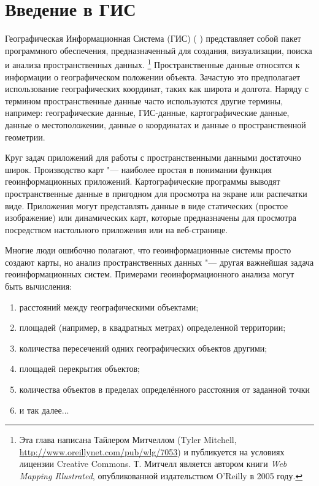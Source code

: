 \pagestyle{scrheadings}
\chapter{Введение в ГИС}\label{label_intro}


Географическая Информационная Система (ГИС) (\cite{mitchel05}
) представляет собой пакет программного обеспечения, предназначенный для
создания, визуализации, поиска и анализа пространственных данных.
\footnote{Эта глава написана Тайлером Митчеллом (Tyler Mitchell,
\url{http://www.oreillynet.com/pub/wlg/7053}) и публикуется на условиях
лицензии Creative Commons. Т. Митчелл является автором книги
\textit{Web Mapping Illustrated}, опубликованной издательством O'Reilly
в 2005 году.}
Пространственные данные относятся к информации
о географическом положении объекта. Зачастую это предполагает
использование географических координат, таких как широта и долгота. Наряду с термином пространственные данные часто используются
другие термины, например: географические данные, ГИС-данные,
картографические данные, данные о местоположении, данные о координатах
и данные о пространственной геометрии.

Круг задач приложений для работы с пространственными данными достаточно широк.
Производство карт "--- наиболее простая в понимании функция
геоинформационных приложений. Картографические программы выводят
пространственные данные в пригодном для просмотра на экране или распечатки виде.
Приложения могут представлять данные в виде статических (простое изображение) или
динамических карт, которые предназначены для просмотра посредством
настольного приложения или на веб-странице.

Многие люди ошибочно полагают, что геоинформационные системы просто
создают карты, но анализ пространственных данных "--- другая важнейшая
задача геоинформационных систем. Примерами геоинформационного анализа
могут быть вычисления:

\begin{enumerate}
\item расстояний между географическими объектами;
\item площадей (например, в квадратных метрах) определенной территории;
\item количества пересечений одних географических объектов другими;
\item площадей перекрытия объектов;
\item количества объектов в пределах определённого расстояния от заданной точки
\item и так далее...
\end{enumerate}


